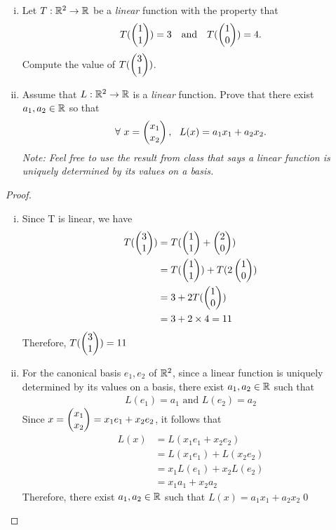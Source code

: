 \begin{question}
	\normalfont
	
	
	\begin{enumerate}[(i)]
		\item Let $T:{\mathbb R}^2\to{\mathbb R}$ be a \emph{linear} function with the property that
		\begin{align*}
			T(\ColVecTwo{1}{1}) = 3\ \ \ \text{and}\ \ \ 
			T(\ColVecTwo{1}{0}) = 4.
		\end{align*}
		Compute the value of $T(\begin{pmatrix} 3\\ 1\end{pmatrix})$.
		
		\item Assume that $L:{\mathbb R}^2\to{\mathbb R}$ is a \emph{linear} function.  Prove that there exist $a_1,a_2\in{\mathbb R}$ so that 
		\begin{align*}
			\forall\ x=\begin{pmatrix} x_1\\ x_2\end{pmatrix},\ \ L(x) = a_1x_1 + a_2x_2.
		\end{align*}
		\emph{Note: Feel free to use the result from class that says a linear function is uniquely determined by its values on a basis.}
	\end{enumerate}
\end{question}

\begin{proof}
	\renewcommand{\qedsymbol}{$\blacksquare$}
	\begin{enumerate}[(i)]
		\item Since T is linear, we have
		\begin{equation*}
			\begin{aligned}
				T(\begin{pmatrix} 3\\ 1\end{pmatrix})
				&=T(\begin{pmatrix} 1\\ 1\end{pmatrix}+\begin{pmatrix} 2\\ 0\end{pmatrix})\\
				&=T(\begin{pmatrix} 1\\ 1\end{pmatrix})+T(2\begin{pmatrix} 1\\ 0\end{pmatrix})\\
				&=3+2T(\begin{pmatrix} 1\\ 0\end{pmatrix})\\
				&=3+2\times4
				=11
			\end{aligned}
		\end{equation*}
		Therefore, $T(\begin{pmatrix} 3\\ 1\end{pmatrix})=11$
		\item For the canonical basis $e_1,e_2$ of $\mathbb R^2$, since a linear function is uniquely determined by its values on a basis, there exist $a_1,a_2\in\mathbb R$ such that 
        \[
            \begin{aligned}
                L(e_1)=a_1 \text{ and } L(e_2)=a_2
            \end{aligned}
        \]
        Since $x=\begin{pmatrix} x_1\\ x_2\end{pmatrix}=x_1e_1+x_2e_2$, it follows that 
        \[
            \begin{aligned}
                L(x) &= L(x_1e_1+x_2e_2)\\
                     &= L(x_1e_1)+L(x_2e_2)\\
                     &= x_1L(e_1)+x_2L(e_2)\\
                     &= x_1a_1+x_2a_2      
            \end{aligned}
        \]
        Therefore, there exist $a_1,a_2\in\mathbb R$ such that $L(x)=a_1x_1+a_2x_2$\qed
	\end{enumerate}

	\renewcommand{\qedsymbol}{}
\end{proof}